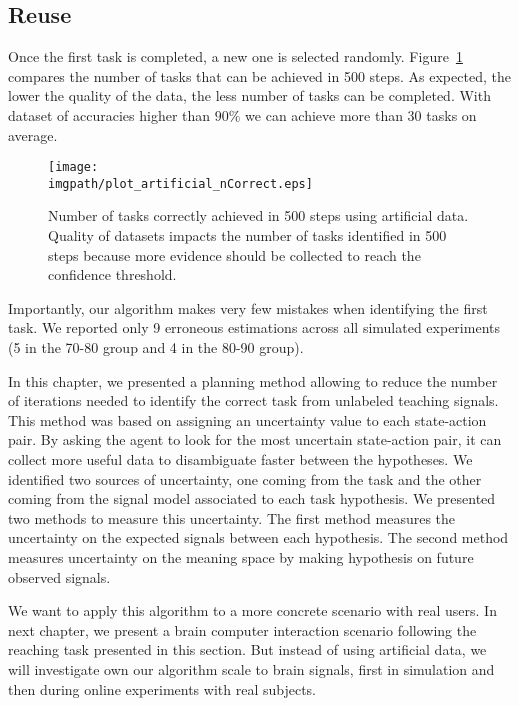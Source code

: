 \subsection{Reuse}

Once the first task is completed, a new one is selected randomly. Figure~\ref{fig:nCorrectArtificial} compares the number of tasks that can be achieved in 500 steps. As expected, the lower the quality of the data, the less number of tasks can be completed. With dataset of accuracies higher than $90\%$ we can achieve more than 30 tasks on average.

\begin{figure}[!htbp]
    \centering
    \texttt{[image: \\imgpath/plot\_artificial\_nCorrect.eps]}
    \caption{Number of tasks correctly achieved in 500 steps using artificial data. Quality of datasets impacts the number of tasks identified in 500 steps because more evidence should be collected to reach the confidence threshold.}
    \label{fig:nCorrectArtificial}
\end{figure} 

Importantly, our algorithm makes very few mistakes when identifying the first task. We reported only 9 erroneous estimations across all simulated experiments (5 in the 70-80 group and 4 in the 80-90 group).

\transition

In this chapter, we presented a planning method allowing to reduce the number of iterations needed to identify the correct task from unlabeled teaching signals. This method was based on assigning an uncertainty value to each state-action pair. By asking the agent to look for the most uncertain state-action pair, it can collect more useful data to disambiguate faster between the hypotheses. We identified two sources of uncertainty, one coming from the task and the other coming from the signal model associated to each task hypothesis. We presented two methods to measure this uncertainty. The first method measures the uncertainty on the expected signals between each hypothesis. The second method measures uncertainty on the meaning space by making hypothesis on future observed signals.

We want to apply this algorithm to a more concrete scenario with real users. In next chapter, we present a brain computer interaction scenario following the reaching task presented in this section. But instead of using artificial data, we will investigate own our algorithm scale to brain signals, first in simulation and then during online experiments with real subjects.

